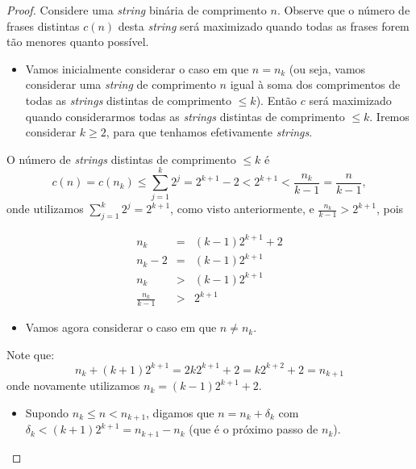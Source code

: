 \begin{frame}[allowframebreaks]
\begin{proof}
	\proofbreak
	Considere uma \textit{string} binária de comprimento $n$. Observe que o número de frases
	distintas $c(n)$ desta \textit{string} será maximizado quando todas as frases forem tão menores quanto possível.

	\begin{itemize}
	\item Vamos inicialmente considerar o caso em que $n = n_k$ (ou seja, vamos considerar uma
	\textit{string} de comprimento $n$ igual à soma dos comprimentos de todas as \textit{strings}
	distintas de comprimento $\leq k$). Então $c$ será maximizado quando considerarmos todas
	as \textit{strings} distintas de comprimento $\leq k$. Iremos considerar $k \geq 2$,
	para que tenhamos efetivamente \textit{strings}.
	\end{itemize}

	\proofbreak
	O número de \textit{strings} distintas de comprimento $\leq k$ é
	\begin{equation}
	c(n) = c(n_k) \leq \sum_{j=1}^k 2^j = 2^{k+1} - 2 < 2^{k+1} < \frac{n_k}{k-1} = \frac{n}{k-1} ,
	\end{equation}
	onde utilizamos $\sum_{j=1}^k 2^j = 2^{k+1}$, como visto anteriormente, e $\frac{n_k}{k-1} > 2^{k+1}$,
	pois

	\proofbreak

	\begin{eqnarray}
	n_k &=& (k-1) 2^{k+1} + 2 \nonumber \\
	n_k - 2 &=& (k-1) 2^{k+1} \nonumber \\
	n_k &>& (k-1) 2^{k+1} \nonumber \\
	\frac{n_k}{k-1} &>& 2^{k+1} 
	\end{eqnarray}

	\proofbreak

	\begin{itemize}
        \item Vamos agora considerar o caso em que $n \neq n_k$.
	\end{itemize}

	Note que:
	\begin{equation}
	n_k + (k+1) 2^{k+1} = 2k 2^{k+1} + 2 = k 2^{k+2} + 2 = n_{k+1}
	\end{equation}
	onde novamente utilizamos $n_k = (k-1) 2^{k+1} + 2$.

	\proofbreak
	\begin{itemize}
        \item Supondo $n_k \leq n < n_{k+1}$, digamos que $n = n_k + \delta_k$ com
		$\delta_k < (k+1)2^{k+1} = n_{k+1} - n_k$ (que é o próximo passo de $n_k$).


\end{itemize}
\end{proof}
\end{frame}
